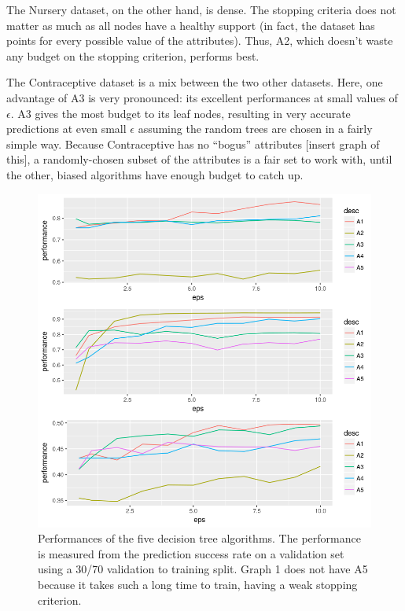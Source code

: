 \documentclass[11pt]{report}
\begin{document}
The Nursery dataset, on the other hand, is dense. The stopping criteria does not matter as much as all nodes have a healthy support (in fact, the dataset has points for every possible value of the attributes). Thus, A2, which doesn't waste any budget on the stopping criterion, performs best.

The Contraceptive dataset is a mix between the two other datasets. Here, one advantage of A3 is very pronounced: its excellent performances at small values of $\epsilon$. A3 gives the most budget to its leaf nodes, resulting in very accurate predictions at even small $\epsilon$ assuming the random trees are chosen in a fairly simple way. Because Contraceptive has no ``bogus'' attributes [insert graph of this], a randomly-chosen subset of the attributes is a fair set to work with, until the other, biased algorithms have enough budget to catch up.
\begin{figure}
\begin{center}
\includegraphics[scale=0.7]{Graph_Performances}
\end{center}
\caption{Performances of the five decision tree algorithms. The performance is measured from the prediction success rate on a validation set using a 30/70 validation to training split. Graph 1 does not have A5 because it takes such a long time to train, having a weak stopping criterion.}
\label{fig:datadep}
\end{figure}
\end{document}
